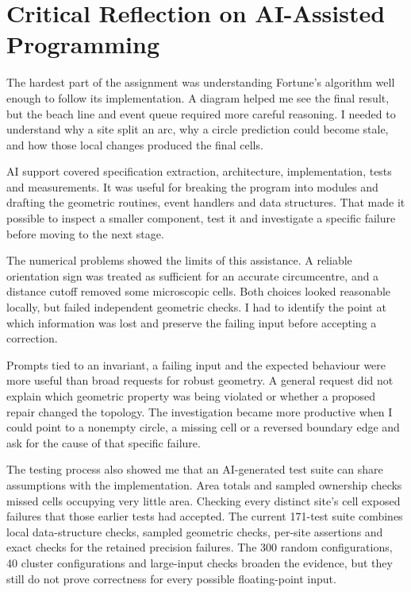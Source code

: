 \section{Critical Reflection on AI-Assisted Programming}
\label{sec:8}

The hardest part of the assignment was understanding Fortune's algorithm well enough to follow its implementation. A diagram helped me see the final result, but the beach line and event queue required more careful reasoning. I needed to understand why a site split an arc, why a circle prediction could become stale, and how those local changes produced the final cells.

AI support covered specification extraction, architecture, implementation, tests and measurements. It was useful for breaking the program into modules and drafting the geometric routines, event handlers and data structures. That made it possible to inspect a smaller component, test it and investigate a specific failure before moving to the next stage.

The numerical problems showed the limits of this assistance. A reliable orientation sign was treated as sufficient for an accurate circumcentre, and a distance cutoff removed some microscopic cells. Both choices looked reasonable locally, but failed independent geometric checks. I had to identify the point at which information was lost and preserve the failing input before accepting a correction.

Prompts tied to an invariant, a failing input and the expected behaviour were more useful than broad requests for robust geometry. A general request did not explain which geometric property was being violated or whether a proposed repair changed the topology. The investigation became more productive when I could point to a nonempty circle, a missing cell or a reversed boundary edge and ask for the cause of that specific failure.

The testing process also showed me that an AI-generated test suite can share assumptions with the implementation. Area totals and sampled ownership checks missed cells occupying very little area. Checking every distinct site's cell exposed failures that those earlier tests had accepted. The current 171-test suite combines local data-structure checks, sampled geometric checks, per-site assertions and exact checks for the retained precision failures. The 300 random configurations, 40 cluster configurations and large-input checks broaden the evidence, but they still do not prove correctness for every possible floating-point input.

